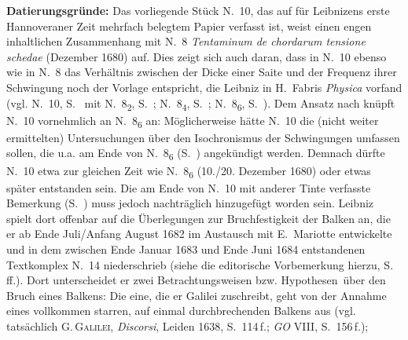 \begin{ledgroup}
\footnotesize
\pstart
\noindent
\textbf{Datierungsgründe:}
Das vorliegende Stück N.~10, das auf für Leibnizens erste Hannoveraner Zeit mehr\-fach belegtem Papier verfasst ist, weist einen engen inhaltlichen Zusammenhang mit N.~8 \textit{Tentaminum de chordarum tensione schedae} (Dezember 1680) auf.
Dies zeigt sich auch daran, dass in N.~10 %
ebenso wie in N.~8 %
das Verhältnis zwischen der Dicke einer %
Saite und der Frequenz ihrer Schwingung noch der Vorlage entspricht, die Leibniz in H.~Fabris\protect{} \cite{00044}\textit{Physica} vorfand
(vgl. N.~10, S.~ mit 
N.~8\textsubscript{2}, S.~; 
N.~8\textsubscript{4}, S.~; 
N.~8\textsubscript{6}, S.~).
Dem Ansatz nach knüpft N.~10 vornehmlich an N.~8\textsubscript{6} an:
Möglicherweise hätte N.~10 die (nicht weiter ermittelten) Untersuchungen über den Isochronismus der Schwingungen umfassen sollen, die u.a. am Ende von N.~8\textsubscript{6} (S.~) angekündigt werden.
Demnach dürfte N.~10 etwa zur gleichen Zeit wie N.~8\textsubscript{6} (10./20. Dezember 1680) oder etwas später entstanden sein.
\pend%
\pstart%
Die am Ende von N.~10 mit anderer Tinte verfasste Bemerkung (S.~) muss jedoch nach\-träglich hinzugefügt worden sein.
Leibniz spielt dort offenbar auf die Überlegungen zur Bruchfestigkeit der Balken 
an, die er ab Ende Juli/Anfang August 1682 im Austausch mit E.~Mariotte\protect{} entwickelte und
in dem zwischen Ende Januar 1683 und Ende Juni 1684 entstandenen Textkomplex N.~14 niederschrieb (siehe die editorische Vorbemerkung hierzu, S.~\pageref{AE_1684_319-325_intro_jecg}\,ff.).
Dort unterscheidet er zwei Betrachtungsweisen bzw. \glqq Hypothesen\grqq\ über den Bruch eines Balkens:
Die eine, die er Galilei\protect{} zuschreibt, geht von der Annahme eines vollkommen starren, auf einmal durchbrechenden Balkens aus (vgl. tatsächlich G.\,\textsc{Galilei}, \textit{Discorsi}, Leiden 1638, S.~114\,f.\cite{00050}; \textit{GO} VIII, S.~156\,f.\cite{00048});

\end{ledgroup}
